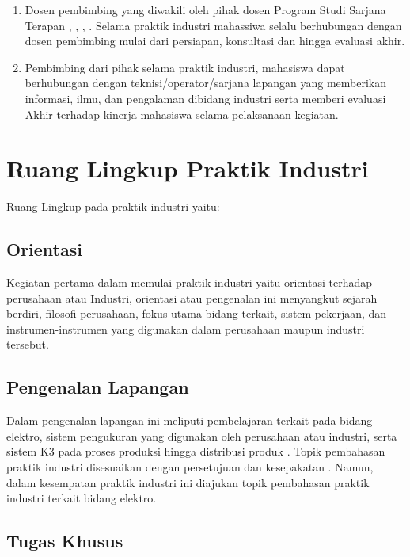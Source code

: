 \begin{enumerate}[label=\Alph*]
    \item Dosen pembimbing yang diwakili oleh pihak dosen Program Studi Sarjana Terapan {\prodi}, {\departemen}, {\fakultas}, {\universitas}. Selama praktik industri mahassiwa selalu berhubungan dengan dosen pembimbing mulai dari persiapan, konsultasi dan hingga evaluasi akhir.
    \item Pembimbing dari pihak {\perusahaan} selama praktik industri, mahasiswa dapat berhubungan dengan teknisi/operator/sarjana lapangan yang memberikan informasi, ilmu, dan pengalaman dibidang industri serta memberi evaluasi Akhir terhadap kinerja mahasiswa selama pelaksanaan kegiatan.
\end{enumerate}

\section{Ruang Lingkup Praktik Industri}

Ruang Lingkup pada praktik industri yaitu:

\subsection{Orientasi}

Kegiatan pertama dalam memulai praktik industri yaitu orientasi terhadap perusahaan atau Industri, orientasi atau pengenalan ini menyangkut sejarah berdiri, filosofi perusahaan, fokus utama bidang terkait, sistem pekerjaan, dan instrumen-instrumen yang digunakan dalam perusahaan maupun industri tersebut.

\subsection{Pengenalan Lapangan}

Dalam pengenalan lapangan ini meliputi pembelajaran terkait pada bidang elektro, sistem pengukuran yang digunakan oleh perusahaan atau industri, serta sistem K3 pada proses produksi hingga distribusi produk {\perusahaan}. Topik pembahasan praktik industri disesuaikan dengan persetujuan dan kesepakatan {\perusahaan}. Namun, dalam kesempatan praktik industri ini diajukan topik pembahasan praktik industri terkait bidang elektro.

\subsection{Tugas Khusus}

